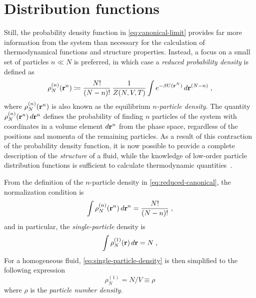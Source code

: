 \section{Distribution functions}

Still, the probability density function in \autoref{eq:canonical-limit} provides far more
information from the system than necessary for the calculation of thermodynamical functions
and structure properties. Instead, a focus on a small set of particles $n \ll N$ is 
preferred, in which case a \emph{reduced probability density} is defined as
\begin{equation}
    \rho^{(n)}_{N} (\mathbf{r}^{n}) \coloneqq \frac{N!}{(N-n)!} \, \frac{1}{Z(N,V,T)}
    \int e^{- \beta U(\mathbf{r}^{N})} \, d \mathbf{r}^{(N-n)} \; ,
    \label{eq:reduced-canonical}
\end{equation}
where $\rho^{(n)}_{N} (\mathbf{r}^{n})$ is also known as the equilibrium 
$n$\emph{-particle density}.
The quantity $\rho^{(n)}_{N} (\mathbf{r}^{n}) \, d \mathbf{r}^{n}$ defines the probability of finding
$n$ particles of the system with coordinates in a volume element $d \mathbf{r}^{n}$ from the
phase space, regardless of the positions and momenta of the remaining particles.
As a result of this contraction of the probability density function, it is now possible to
provide a complete description of the \emph{structure} of a fluid, while the knowledge
of low-order particle distribution functions is sufficient to calculate thermodynamic
quantities~\cite{mcquarrieStatisticalMechanics2000}.

From the definition of the $n$-particle density in \autoref{eq:reduced-canonical}, the
normalization condition is
\begin{equation}
    \int \rho^{(n)}_{N} (\mathbf{r}^{n}) \, d \mathbf{r}^{n} = \frac{N!}{(N-n)!} \; ,
    \label{eq:normalization-reduced}
\end{equation}
and in particular, the \emph{single-particle} density is
\begin{equation}
    \int \rho^{(1)}_{N} (\mathbf{r}) \, d \mathbf{r} = N \; ,
    \label{eq:single-particle-density}
\end{equation}
For a homogeneous fluid, \autoref{eq:single-particle-density} is then simplified
to the following expression
\begin{equation}
    \rho^{(1)}_{N} = N / V \equiv \rho
    \label{eq:homogeneous-density}
\end{equation}
where $\rho$ is the \emph{particle number density}.

